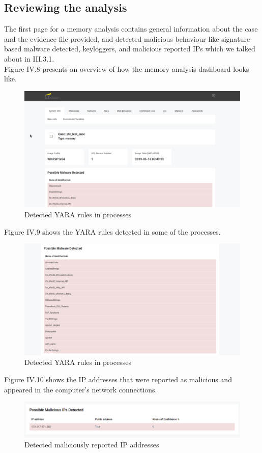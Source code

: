 \subsection{Reviewing the analysis}
The first page for a memory analysis contains general information about the case and the evidence file provided, and detected malicious behaviour like signature-based malware detected, keyloggers, and malicious reported IPs which we talked about in III.3.1.\\
Figure IV.8 presents an overview of how the memory analysis dashboard looks like.
\begin{figure}[H]
\centering
\includegraphics[width=0.9\columnwidth]{Figures/8.png}
\caption{Detected YARA rules in processes}
\end{figure}
Figure IV.9 shows the YARA rules detected in some of the processes.
\begin{figure}[H]
\centering
\includegraphics[width=0.9\columnwidth]{Figures/9.png}
\caption{Detected YARA rules in processes}
\end{figure}
Figure IV.10 shows the IP addresses that were reported as malicious and appeared in the computer's network connections.
\begin{figure}[H]
\centering
\includegraphics[width=0.9\columnwidth]{Figures/10.png}
\caption{Detected maliciously reported IP addresses}
\end{figure}
